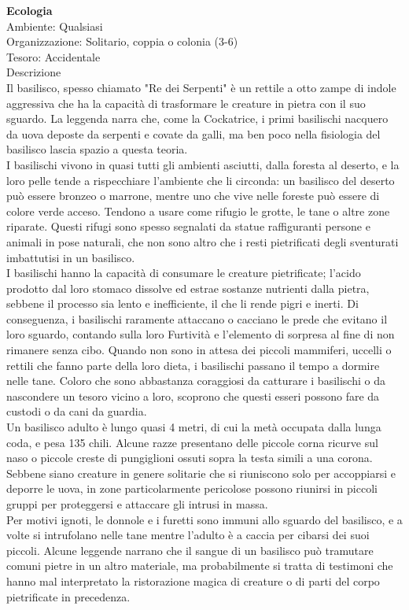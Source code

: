 \begin{multicols}{2}
\textbf{Ecologia}\\
Ambiente: Qualsiasi\\
Organizzazione: Solitario, coppia o colonia (3-6)\\
Tesoro: Accidentale\\
Descrizione\\
Il basilisco, spesso chiamato "Re dei Serpenti" è un rettile a otto zampe di indole aggressiva che ha la capacità di trasformare le creature in pietra con il suo sguardo. La leggenda narra che, come la Cockatrice, i primi basilischi nacquero da uova deposte da serpenti e covate da galli, ma ben poco nella fisiologia del basilisco lascia spazio a questa teoria.\\
I basilischi vivono in quasi tutti gli ambienti asciutti, dalla foresta al deserto, e la loro pelle tende a rispecchiare l'ambiente che li circonda: un basilisco del deserto può essere bronzeo o marrone, mentre uno che vive nelle foreste può essere di colore verde acceso. Tendono a usare come rifugio le grotte, le tane o altre zone riparate. Questi rifugi sono spesso segnalati da statue raffiguranti persone e animali in pose naturali, che non sono altro che i resti pietrificati degli sventurati imbattutisi in un basilisco.\\
I basilischi hanno la capacità di consumare le creature pietrificate; l'acido prodotto dal loro stomaco dissolve ed estrae sostanze nutrienti dalla pietra, sebbene il processo sia lento e inefficiente, il che li rende pigri e inerti. Di conseguenza, i basilischi raramente attaccano o cacciano le prede che evitano il loro sguardo, contando sulla loro Furtività e l'elemento di sorpresa al fine di non rimanere senza cibo. Quando non sono in attesa dei piccoli mammiferi, uccelli o rettili che fanno parte della loro dieta, i basilischi passano il tempo a dormire nelle tane. Coloro che sono abbastanza coraggiosi da catturare i basilischi o da nascondere un tesoro vicino a loro, scoprono che questi esseri possono fare da custodi o da cani da guardia.\\
Un basilisco adulto è lungo quasi 4 metri, di cui la metà occupata dalla lunga coda, e pesa 135 chili. Alcune razze presentano delle piccole corna ricurve sul naso o piccole creste di pungiglioni ossuti sopra la testa simili a una corona. Sebbene siano creature in genere solitarie che si riuniscono solo per accoppiarsi e deporre le uova, in zone particolarmente pericolose possono riunirsi in piccoli gruppi per proteggersi e attaccare gli intrusi in massa.\\
Per motivi ignoti, le donnole e i furetti sono immuni allo sguardo del basilisco, e a volte si intrufolano nelle tane mentre l'adulto è a caccia per cibarsi dei suoi piccoli. Alcune leggende narrano che il sangue di un basilisco può tramutare comuni pietre in un altro materiale, ma probabilmente si tratta di testimoni che hanno mal interpretato la ristorazione magica di creature o di parti del corpo pietrificate in precedenza.\\



\end{multicols}
